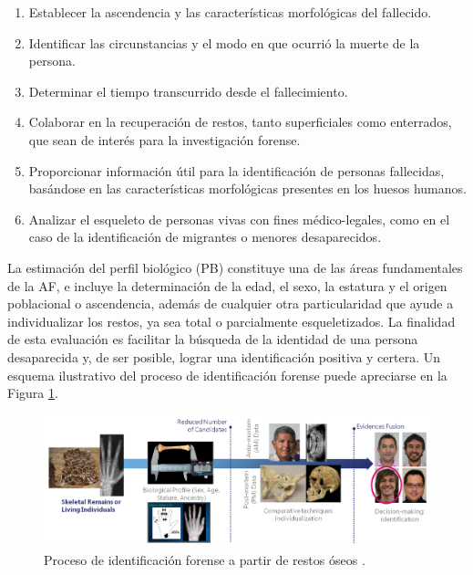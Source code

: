 \begin{enumerate}
    \item Establecer la ascendencia y las características morfológicas del fallecido.
    \item Identificar las circunstancias y el modo en que ocurrió la muerte de la persona.
    \item Determinar el tiempo transcurrido desde el fallecimiento.
    \item Colaborar en la recuperación de restos, tanto superficiales como enterrados, que sean de interés para la investigación forense.
    \item Proporcionar información útil para la identificación de personas fallecidas, basándose en las características morfológicas presentes en los huesos humanos.
    \item Analizar el esqueleto de personas vivas con fines médico-legales, como en el caso de la identificación de migrantes o menores desaparecidos.
\end{enumerate}

La estimación del perfil biológico (PB) constituye una de las áreas fundamentales de la AF, e incluye la determinación de la edad, el sexo, la estatura y el origen poblacional o ascendencia, además de cualquier otra particularidad que ayude a individualizar los restos, ya sea total o parcialmente esqueletizados. La finalidad de esta evaluación es facilitar la búsqueda de la identidad de una persona desaparecida y, de ser posible, lograr una identificación positiva y certera. Un esquema ilustrativo del proceso de identificación forense puede apreciarse en la Figura \ref{fig:intro_1}.

\begin{figure}[h]
    \centering
    \includegraphics[width=1\linewidth]{figures/1_introduction/intro_1.png}
    \caption[Proceso de identificación forense a partir de restos óseos]{Proceso de identificación forense a partir de restos óseos \cite{RefWorks:RefID:21-mesejo2020survey}.}
    \label{fig:intro_1}
\end{figure}

